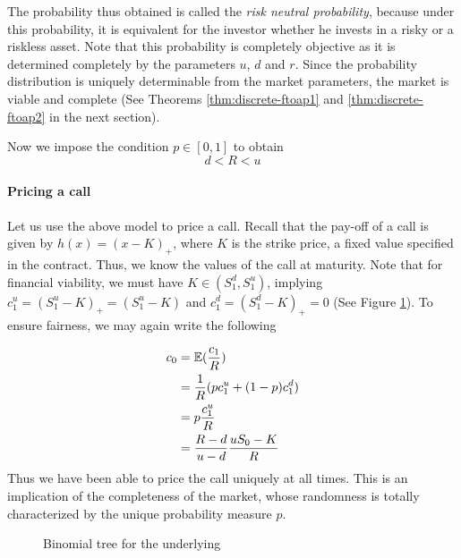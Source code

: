 The probability thus obtained is called the \emph{risk neutral probability}, because under this probability, it is equivalent for the investor whether he invests in a risky or a riskless asset. Note that this probability is completely objective as it is determined completely by the parameters $ u $, $ d $ and $ r $. Since the probability distribution is uniquely determinable from the market parameters, the market is viable and complete (See Theorems \ref{thm:discrete-ftoap1} and \ref{thm:discrete-ftoap2} in the next section).

Now we impose the condition $ p \in [0,1] $ to obtain
\begin{equation}
	\label{eq:discrete-feasibility-condition}
	d < R < u
\end{equation}


\paragraph{Pricing a call}

Let us use the above model to price a call. Recall that the pay-off of a call is given by $ h(x) = (x - K)_+ $, where $ K $ is the strike price, a fixed value specified in the contract. Thus, we know the values of the call at maturity. Note that for financial viability, we must have $ K \in (S_1^d, S_1^u) $, implying $ c_1^u = (S_1^u - K)_+ = (S_1^u - K) $ and $ c_1^d = (S_1^d - K)_+ = 0 $ (See Figure \ref{fig:discrete-2tr-call}). To ensure fairness, we may again write the following


\begin{align*}
	c_0 &= \operatorname{\mathbb{E}}(\frac{c_1}{R}) \\
	    &= \frac{1}{R} ( p c_1^u + (1-p) c_1^d ) \\
	    &= p \frac{c_1^u}{R} \\
	    &= \frac{R - d}{u - d} \frac{u S_0 - K}{R}
\end{align*}
Thus we have been able to price the call uniquely at all times. This is an implication of the completeness of the market, whose randomness is totally characterized by the unique probability measure $ p $.


\begin{figure}
	
	\caption{Binomial tree for the underlying}
	\label{fig:discrete-2tr-call}
\end{figure}


